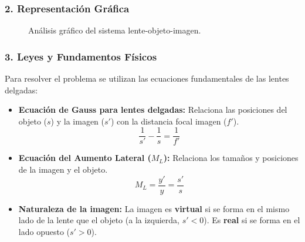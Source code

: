 \subsubsection*{2. Representación Gráfica}
\begin{figure}[H]
    \centering
    \caption{Análisis gráfico del sistema lente-objeto-imagen.}
\end{figure}

\subsubsection*{3. Leyes y Fundamentos Físicos}
Para resolver el problema se utilizan las ecuaciones fundamentales de las lentes delgadas:
\begin{itemize}
    \item \textbf{Ecuación de Gauss para lentes delgadas:} Relaciona las posiciones del objeto ($s$) y la imagen ($s'$) con la distancia focal imagen ($f'$).
    $$ \frac{1}{s'} - \frac{1}{s} = \frac{1}{f'} $$
    \item \textbf{Ecuación del Aumento Lateral ($M_L$):} Relaciona los tamaños y posiciones de la imagen y el objeto.
    $$ M_L = \frac{y'}{y} = \frac{s'}{s} $$
    \item \textbf{Naturaleza de la imagen:} La imagen es \textbf{virtual} si se forma en el mismo lado de la lente que el objeto (a la izquierda, $s'<0$). Es \textbf{real} si se forma en el lado opuesto ($s'>0$).
\end{itemize}

